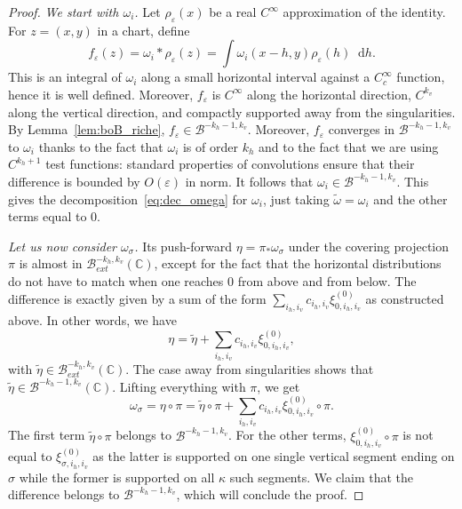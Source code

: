 \documentclass[11pt, a4paper, oneside, final, pagebackref]{amsart}
\newcommand{\boB}{\mathcal{B}}
\newcommand{\C}{\mathbb{C}}
\newcommand{\dd}{\mathop{}\!\mathrm{d}}
\renewcommand{\epsilon}{\varepsilon}
\theoremstyle{definition}
\numberwithin{equation}{section}
\begin{document}
\begin{proof}
\emph{We start with $\omega_i$.} Let $\rho_\epsilon(x)$ be a real $C^\infty$
approximation of the identity. For $z = (x,y)$ in a chart, define
\begin{equation*}
  f_\epsilon(z) = \omega_i * \rho_\epsilon (z) = \int \omega_i(x-h, y) \rho_\epsilon(h) \dd h.
\end{equation*}
This is an integral of $\omega_i$ along a small horizontal interval against a
$C^\infty_c$ function, hence it is well defined. Moreover, $f_\epsilon$ is
$C^\infty$ along the horizontal direction, $C^{k_v}$ along the vertical
direction, and compactly supported away from the singularities. By
Lemma~\ref{lem:boB_riche}, $f_\epsilon \in \boB^{-k_h-1, k_v}$. Moreover,
$f_\epsilon$ converges in $\boB^{-k_h-1, k_v}$ to $\omega_i$ thanks to the
fact that $\omega_i$ is of order $k_h$ and to the fact that we are using
$C^{k_h+1}$ test functions: standard properties of convolutions ensure that
their difference is bounded by $O(\epsilon)$ in norm. It follows that
$\omega_i \in \boB^{-k_h-1, k_v}$. This gives the
decomposition~\eqref{eq:dec_omega} for $\omega_i$, just taking
$\tilde\omega=\omega_i$ and the other terms equal to $0$.

\emph{Let us now consider $\omega_\sigma$.} Its push-forward $\eta =\pi_*
\omega_\sigma$ under the covering projection $\pi$ is almost in
$\boB_{ext}^{-k_h, k_v}(\C)$, except for the fact that the horizontal
distributions do not have to match when one reaches $0$ from above and from
below. The difference is exactly given by a sum of the form $\sum_{i_h, i_v}
c_{i_h, i_v} \xi^{(0)}_{0, i_h, i_v}$ as constructed above. In other words,
we have
\begin{equation*}
  \eta = \tilde \eta + \sum_{i_h, i_v} c_{i_h, i_v} \xi^{(0)}_{0, i_h, i_v},
\end{equation*}
with $\tilde\eta \in \boB_{ext}^{-k_h, k_v}(\C)$. The case away from
singularities shows that $\tilde \eta \in \boB^{-k_h-1, k_v}(\C)$. Lifting
everything with $\pi$, we get
\begin{equation*}
  \omega_\sigma = \eta \circ \pi = \tilde \eta \circ \pi + \sum_{i_h, i_v} c_{i_h, i_v} \xi^{(0)}_{0, i_h, i_v} \circ \pi.
\end{equation*}
The first term $\tilde \eta \circ \pi$ belongs to $\boB^{-k_h-1, k_v}$. For
the other terms, $\xi^{(0)}_{0, i_h, i_v} \circ \pi$ is not equal to
$\xi^{(0)}_{\sigma, i_h, i_v}$ as the latter is supported on one single
vertical segment ending on $\sigma$ while the former is supported on all
$\kappa$ such segments. We claim that the difference belongs to
$\boB^{-k_h-1, k_v}$, which will conclude the proof.


\end{proof}
\end{document}
